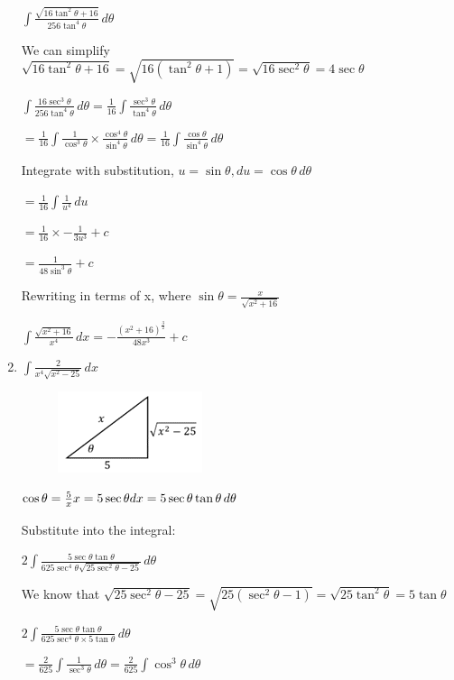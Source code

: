 \documentclass[../main.tex]{subfiles}
\begin{document}
\begin{enumerate}
    \(\int \frac{\sqrt{16\tan^2{\theta}+16}}{256\tan^4{\theta}}\,d\theta\)

    We can simplify \(\sqrt{16\tan^2{\theta}+16}=\sqrt{16(\tan^2{\theta}+1)}=\sqrt{16\sec^2{\theta}}=4\sec{\theta}\)
    
    \(\int \frac{16\sec^3{\theta}}{256\tan^4{\theta}}\,d\theta=\frac{1}{16}\int \frac{\sec^3{\theta}}{\tan^4{\theta}}\,d\theta\)

    \(=\frac{1}{16}\int \frac{1}{\cos^3{\theta}}\times \frac{\cos^4{\theta}}{\sin^4{\theta}}\,d\theta=\frac{1}{16}\int \frac{\cos{\theta}}{\sin^4{\theta}}\,d\theta\)

    Integrate with substitution, \(u=\sin{\theta}, du=\cos{\theta}\,d\theta\)

    \(=\frac{1}{16}\int \frac{1}{u^4}\,du\)

    \(=\frac{1}{16}\times -\frac{1}{3u^3}+c\)

    \(=\frac{1}{48\sin^3{\theta}}+c\)

    Rewriting in terms of x, where \(\sin{\theta}=\frac{x}{\sqrt{x^2+16}}\)

    \(\int \frac{\sqrt{x^2+16}}{x^4}\,dx=-\frac{(x^2+16)^\frac{3}{2}}{48x^3}+c\)

    \item 
    \(\int \frac{2}{x^4\sqrt{x^2-25}}\,dx\)
    \begin{figure}[h]
        \includegraphics{images/trigsuba5.png}
    \end{figure}

    \(\cos{\theta}=\frac{5}{x}\\
    x=5\sec{\theta}\\
    dx=5\sec{\theta}\tan{\theta}\,d\theta\)

    Substitute into the integral:

    \(2\int \frac{5\sec{\theta}\tan{\theta}}{625\sec^4{\theta}\sqrt{25\sec^2{\theta}-25}}\,d\theta\)

    We know that \(\sqrt{25\sec^2{\theta}-25}=\sqrt{25(\sec^2{\theta}-1)}=\sqrt{25\tan^2{\theta}}=5\tan{\theta}\)

    \(2\int \frac{5\sec{\theta}\tan{\theta}}{625\sec^4{\theta}\times 5\tan{\theta}}\,d\theta\)

    \(=\frac{2}{625}\int \frac{1}{\sec^3{\theta}}\,d\theta=\frac{2}{625}\int \cos^3{\theta}\,d\theta\)


\end{enumerate}
\end{document}
